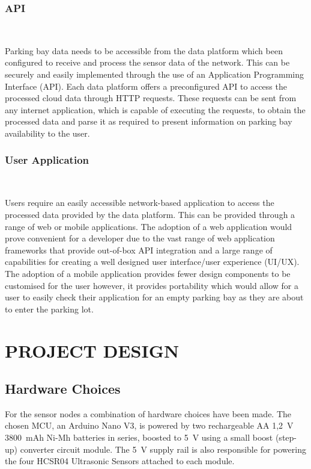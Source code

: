 \documentclass[10pt,twocolumn]{witseiepaper}
\begin{document}
	
		\subsubsection{API} $   $
		
			Parking bay data needs to be accessible from the data platform which been configured to receive and process the sensor data of the network. This can be securely and easily implemented through the use of an Application Programming Interface (API). Each data platform offers a preconfigured API to access the processed cloud data through HTTP requests. These requests can be sent from any internet application, which is capable of executing the requests, to obtain the processed data and parse it as required to present information on parking bay availability to the user.
		
		\subsubsection{User Application} $   $
		
			Users require an easily accessible network-based application to access the processed data provided by the data platform. This can be provided through a range of web or mobile applications. The adoption of a web application would prove convenient for a developer due to the vast range of web application frameworks that provide out-of-box API integration and a large range of capabilities for creating a well designed user interface/user experience (UI/UX). The adoption of a mobile application provides fewer design components to be customised for the user however, it provides portability which would allow for a user to easily check their application for an empty parking bay as they are about to enter the parking lot.
			

\section{PROJECT DESIGN}
	\subsection{Hardware Choices} \label{hardware_choices}
	
		For the sensor nodes a combination of hardware choices have been made. The chosen MCU, an Arduino Nano V3, is powered by two rechargeable AA 1,2~V 3800~mAh \mbox{Ni-Mh} batteries in series, boosted to 5~V using a small boost (step-up) converter circuit module. The 5~V supply rail is also responsible for powering the four HCSR04 Ultrasonic Sensors attached to each module. 
		
\end{document}
